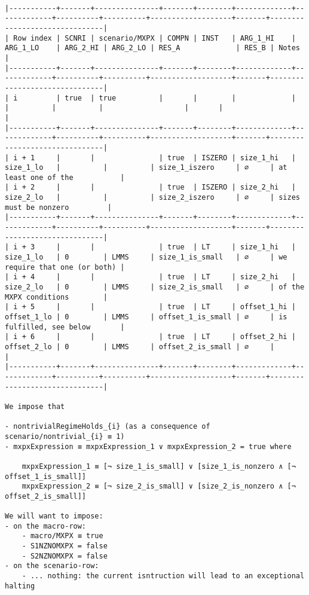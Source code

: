\documentclass[varwidth=\maxdimen,margin=0.5cm,multi={verbatim}]{standalone}
\begin{document}
\begin{verbatim}

|-----------+-------+---------------+-------+--------+-------------+-------------+----------+----------+-------------------+-------+-------------------------------|
| Row index | SCNRI | scenario/MXPX | COMPN | INST   | ARG_1_HI    | ARG_1_LO    | ARG_2_HI | ARG_2_LO | RES_A             | RES_B | Notes                         |
|-----------+-------+---------------+-------+--------+-------------+-------------+----------+----------+-------------------+-------+-------------------------------|
| i         | true  | true          |       |        |             |             |          |          |                   |       |                               |
|-----------+-------+---------------+-------+--------+-------------+-------------+----------+----------+-------------------+-------+-------------------------------|
| i + 1     |       |               | true  | ISZERO | size_1_hi   | size_1_lo   |          |          | size_1_iszero     | ∅     | at least one of the           |
| i + 2     |       |               | true  | ISZERO | size_2_hi   | size_2_lo   |          |          | size_2_iszero     | ∅     | sizes must be nonzero         |
|-----------+-------+---------------+-------+--------+-------------+-------------+----------+----------+-------------------+-------+-------------------------------|
| i + 3     |       |               | true  | LT     | size_1_hi   | size_1_lo   | 0        | LMMS     | size_1_is_small   | ∅     | we require that one (or both) |
| i + 4     |       |               | true  | LT     | size_2_hi   | size_2_lo   | 0        | LMMS     | size_2_is_small   | ∅     | of the MXPX conditions        |
| i + 5     |       |               | true  | LT     | offset_1_hi | offset_1_lo | 0        | LMMS     | offset_1_is_small | ∅     | is fulfilled, see below       |
| i + 6     |       |               | true  | LT     | offset_2_hi | offset_2_lo | 0        | LMMS     | offset_2_is_small | ∅     |                               |
|-----------+-------+---------------+-------+--------+-------------+-------------+----------+----------+-------------------+-------+-------------------------------|

We impose that

- nontrivialRegimeHolds_{i} (as a consequence of scenario/nontrivial_{i} ≡ 1)
- mxpxExpression ≡ mxpxExpression_1 ∨ mxpxExpression_2 = true where

	mxpxExpression_1 ≡ [¬ size_1_is_small] ∨ [size_1_is_nonzero ∧ [¬ offset_1_is_small]]
	mxpxExpression_2 ≡ [¬ size_2_is_small] ∨ [size_2_is_nonzero ∧ [¬ offset_2_is_small]]

We will want to impose:
- on the macro-row:
	- macro/MXPX ≡ true
	- S1NZNOMXPX = false
	- S2NZNOMXPX = false
- on the scenario-row:
	- ... nothing: the current isntruction will lead to an exceptional halting

\end{verbatim}
\end{document}
